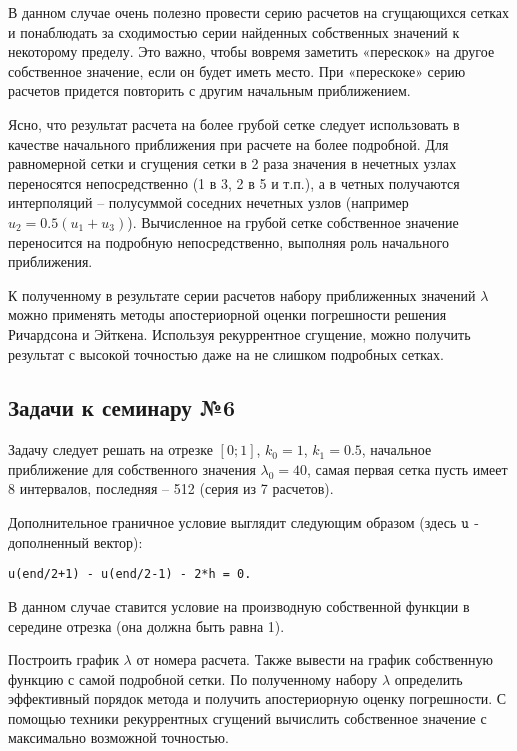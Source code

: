 В данном случае очень полезно провести серию расчетов на сгущающихся сетках и понаблюдать за сходимостью серии найденных собственных значений к некоторому пределу. Это важно, чтобы вовремя заметить «перескок» на другое собственное значение, если он будет иметь место. При «перескоке» серию расчетов придется повторить с другим начальным приближением.

Ясно, что результат расчета на более грубой сетке следует использовать в качестве начального приближения при расчете на более подробной. Для равномерной сетки и сгущения сетки в 2 раза значения в нечетных узлах переносятся непосредственно (1 в 3, 2 в 5 и т.п.), а в четных получаются интерполяций – полусуммой соседних нечетных узлов (например $u_2 = 0.5(u_1+u_3)$). Вычисленное на грубой сетке собственное значение переносится на подробную непосредственно, выполняя роль начального приближения.

К полученному в результате серии расчетов набору приближенных значений $\lambda$ можно применять методы апостериорной оценки погрешности решения Ричардсона и Эйткена. Используя рекуррентное сгущение, можно получить результат с высокой точностью даже на не слишком подробных сетках. 

\subsection{Задачи к семинару №6}
Задачу следует решать на отрезке $[0; 1]$, $k_0 = 1$, $k_1 = 0.5$, начальное приближение для собственного значения $\lambda_0 = 40$, самая первая сетка пусть имеет 8 интервалов, последняя – 512  (серия из 7 расчетов). 

Дополнительное граничное условие выглядит следующим образом (здесь $\texttt{\lstinline|u|}$ - дополненный вектор):
\begin{matlablisting}
	\begin{lstlisting}
u(end/2+1) - u(end/2-1) - 2*h = 0.
	\end{lstlisting}
\end{matlablisting}
В данном случае ставится условие на производную собственной функции в середине отрезка (она должна быть равна 1).

Построить график $\lambda$ от номера расчета. Также вывести на график собственную функцию с самой подробной сетки. По полученному набору $\lambda$ определить эффективный порядок метода и получить апостериорную оценку погрешности. С помощью техники рекуррентных сгущений вычислить собственное значение с максимально возможной точностью.